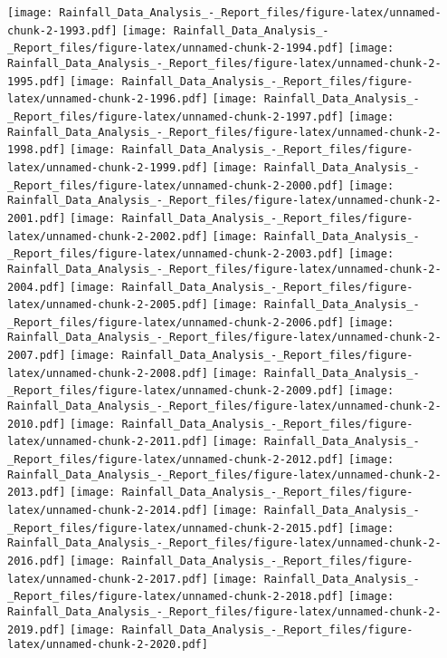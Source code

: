 \documentclass[
]{article}
\begin{document}
\texttt{[image: Rainfall\_Data\_Analysis\_-\_Report\_files/figure-latex/unnamed-chunk-2-1993.pdf]}
\texttt{[image: Rainfall\_Data\_Analysis\_-\_Report\_files/figure-latex/unnamed-chunk-2-1994.pdf]}
\texttt{[image: Rainfall\_Data\_Analysis\_-\_Report\_files/figure-latex/unnamed-chunk-2-1995.pdf]}
\texttt{[image: Rainfall\_Data\_Analysis\_-\_Report\_files/figure-latex/unnamed-chunk-2-1996.pdf]}
\texttt{[image: Rainfall\_Data\_Analysis\_-\_Report\_files/figure-latex/unnamed-chunk-2-1997.pdf]}
\texttt{[image: Rainfall\_Data\_Analysis\_-\_Report\_files/figure-latex/unnamed-chunk-2-1998.pdf]}
\texttt{[image: Rainfall\_Data\_Analysis\_-\_Report\_files/figure-latex/unnamed-chunk-2-1999.pdf]}
\texttt{[image: Rainfall\_Data\_Analysis\_-\_Report\_files/figure-latex/unnamed-chunk-2-2000.pdf]}
\texttt{[image: Rainfall\_Data\_Analysis\_-\_Report\_files/figure-latex/unnamed-chunk-2-2001.pdf]}
\texttt{[image: Rainfall\_Data\_Analysis\_-\_Report\_files/figure-latex/unnamed-chunk-2-2002.pdf]}
\texttt{[image: Rainfall\_Data\_Analysis\_-\_Report\_files/figure-latex/unnamed-chunk-2-2003.pdf]}
\texttt{[image: Rainfall\_Data\_Analysis\_-\_Report\_files/figure-latex/unnamed-chunk-2-2004.pdf]}
\texttt{[image: Rainfall\_Data\_Analysis\_-\_Report\_files/figure-latex/unnamed-chunk-2-2005.pdf]}
\texttt{[image: Rainfall\_Data\_Analysis\_-\_Report\_files/figure-latex/unnamed-chunk-2-2006.pdf]}
\texttt{[image: Rainfall\_Data\_Analysis\_-\_Report\_files/figure-latex/unnamed-chunk-2-2007.pdf]}
\texttt{[image: Rainfall\_Data\_Analysis\_-\_Report\_files/figure-latex/unnamed-chunk-2-2008.pdf]}
\texttt{[image: Rainfall\_Data\_Analysis\_-\_Report\_files/figure-latex/unnamed-chunk-2-2009.pdf]}
\texttt{[image: Rainfall\_Data\_Analysis\_-\_Report\_files/figure-latex/unnamed-chunk-2-2010.pdf]}
\texttt{[image: Rainfall\_Data\_Analysis\_-\_Report\_files/figure-latex/unnamed-chunk-2-2011.pdf]}
\texttt{[image: Rainfall\_Data\_Analysis\_-\_Report\_files/figure-latex/unnamed-chunk-2-2012.pdf]}
\texttt{[image: Rainfall\_Data\_Analysis\_-\_Report\_files/figure-latex/unnamed-chunk-2-2013.pdf]}
\texttt{[image: Rainfall\_Data\_Analysis\_-\_Report\_files/figure-latex/unnamed-chunk-2-2014.pdf]}
\texttt{[image: Rainfall\_Data\_Analysis\_-\_Report\_files/figure-latex/unnamed-chunk-2-2015.pdf]}
\texttt{[image: Rainfall\_Data\_Analysis\_-\_Report\_files/figure-latex/unnamed-chunk-2-2016.pdf]}
\texttt{[image: Rainfall\_Data\_Analysis\_-\_Report\_files/figure-latex/unnamed-chunk-2-2017.pdf]}
\texttt{[image: Rainfall\_Data\_Analysis\_-\_Report\_files/figure-latex/unnamed-chunk-2-2018.pdf]}
\texttt{[image: Rainfall\_Data\_Analysis\_-\_Report\_files/figure-latex/unnamed-chunk-2-2019.pdf]}
\texttt{[image: Rainfall\_Data\_Analysis\_-\_Report\_files/figure-latex/unnamed-chunk-2-2020.pdf]}
\end{document}
